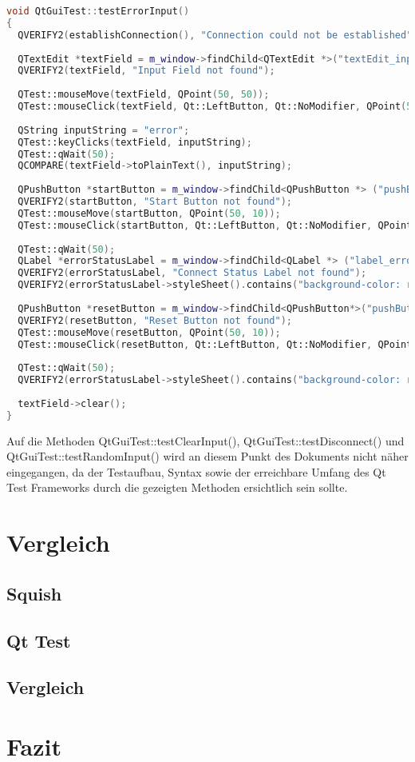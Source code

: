		\begin{lstlisting}[language=C++, caption=qtguitest.cpp]
void QtGuiTest::testErrorInput()
{    
  QVERIFY2(establishConnection(), "Connection could not be established");
	
  QTextEdit *textField = m_window->findChild<QTextEdit *>("textEdit_input");
  QVERIFY2(textField, "Input Field not found");
	
  QTest::mouseMove(textField, QPoint(50, 50));
  QTest::mouseClick(textField, Qt::LeftButton, Qt::NoModifier, QPoint(50, 50));
	
  QString inputString = "error";
  QTest::keyClicks(textField, inputString);
  QTest::qWait(50);
  QCOMPARE(textField->toPlainText(), inputString);
	
  QPushButton *startButton = m_window->findChild<QPushButton *> ("pushButton_start");
  QVERIFY2(startButton, "Start Button not found");
  QTest::mouseMove(startButton, QPoint(50, 10));
  QTest::mouseClick(startButton, Qt::LeftButton, Qt::NoModifier, QPoint(50, 10));
	
  QTest::qWait(50);
  QLabel *errorStatusLabel = m_window->findChild<QLabel *> ("label_errorStatus");
  QVERIFY2(errorStatusLabel, "Connect Status Label not found");
  QVERIFY2(errorStatusLabel->styleSheet().contains("background-color: rgb(203, 47, 47)"), "Color of label_errorStatus is not Red");
	
  QPushButton *resetButton = m_window->findChild<QPushButton*>("pushButton_resetErrorAndEStop");
  QVERIFY2(resetButton, "Reset Button not found");
  QTest::mouseMove(resetButton, QPoint(50, 10));
  QTest::mouseClick(resetButton, Qt::LeftButton, Qt::NoModifier, QPoint(50, 10));
	
  QTest::qWait(50);
  QVERIFY2(errorStatusLabel->styleSheet().contains("background-color: rgb(27, 193, 00)"), "Color of label_errorStatus is not Green");
	
  textField->clear();
}
		\end{lstlisting}
	
		Auf die Methoden QtGuiTest::testClearInput(), QtGuiTest::testDisconnect() und 	QtGuiTest::testRandomInput() wird an diesem Punkt des Dokuments nicht näher eingegangen, da der Testaufbau, Syntax sowie der erreichbare Umfang des Qt Test Frameworks durch die gezeigten Methoden ersichtlich sein sollte.
		
\chapter{Vergleich}

	\section{Squish}
	\section{Qt Test}
	\section{Vergleich}

\chapter{Fazit}